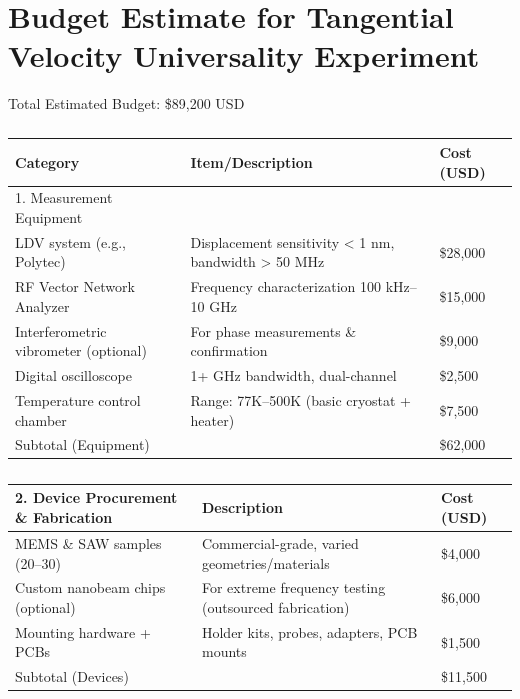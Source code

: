 \section*{Budget Estimate for Tangential Velocity Universality Experiment}

Total Estimated Budget: \$89,200 USD


\begin{table}
    \footnotesize
    \centering
    \begin{tabular}{lll}
        \toprule
        \textbf{Category} & \textbf{Item/Description} & \textbf{Cost (USD)} \\
        \midrule
        1. Measurement Equipment &  &  \\
        LDV system (e.g., Polytec) & Displacement sensitivity < 1 nm, bandwidth > 50 MHz & \$28,000 \\
        RF Vector Network Analyzer & Frequency characterization 100 kHz–10 GHz & \$15,000 \\
        Interferometric vibrometer (optional) & For phase measurements \& confirmation & \$9,000 \\
        Digital oscilloscope &  1+ GHz bandwidth, dual-channel & \$2,500 \\
        Temperature control chamber & Range: 77K–500K (basic cryostat + heater) & \$7,500 \\
        Subtotal (Equipment) &  & \$62,000 \\
        \bottomrule
    \end{tabular}
    \caption{}
    \label{tab:equipment}
\end{table}


\begin{table}
    \footnotesize
        \centering
        \begin{tabular}{lll}
            \toprule
            \textbf{2. Device Procurement \& Fabrication} & \textbf{Description} & \textbf{Cost (USD)} \\
            \midrule
            MEMS \& SAW samples (20–30) & Commercial-grade, varied geometries/materials & \$4,000 \\
            Custom nanobeam chips (optional) & For extreme frequency testing (outsourced fabrication) & \$6,000 \\
            Mounting hardware + PCBs & Holder kits, probes, adapters, PCB mounts & \$1,500 \\
            Subtotal (Devices) &  & \$11,500 \\
            \bottomrule
        \end{tabular}
        \caption{}
        \label{tab:devices}
\end{table}


